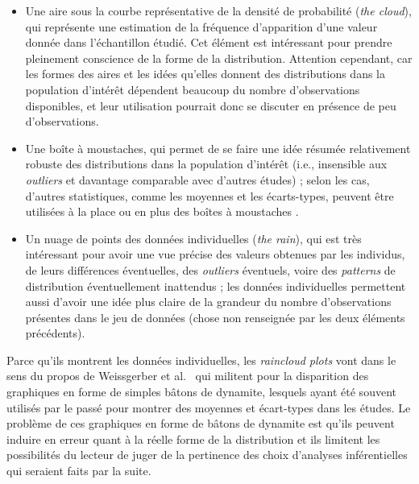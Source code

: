 \documentclass[
  french,
]{book}
\providecommand{\tightlist}{%
  \setlength{\itemsep}{0pt}\setlength{\parskip}{0pt}}
\begin{document}
\begin{itemize}
\tightlist
\item
  Une aire sous la courbe représentative de la densité de probabilité (\emph{the cloud}), qui représente une estimation de la fréquence d'apparition d'une valeur donnée dans l'échantillon étudié. Cet élément est intéressant pour prendre pleinement conscience de la forme de la distribution. Attention cependant, car les formes des aires et les idées qu'elles donnent des distributions dans la population d'intérêt dépendent beaucoup du nombre d'observations disponibles, et leur utilisation pourrait donc se discuter en présence de peu d'observations.
\item
  Une boîte à moustaches, qui permet de se faire une idée résumée relativement robuste des distributions dans la population d'intérêt (i.e., insensible aux \emph{outliers} et davantage comparable avec d'autres études) ; selon les cas, d'autres statistiques, comme les moyennes et les écarts-types, peuvent être utilisées à la place ou en plus des boîtes à moustaches \autocite{allenRaincloudPlotsMultiplatform2019}.
\item
  Un nuage de points des données individuelles (\emph{the rain}), qui est très intéressant pour avoir une vue précise des valeurs obtenues par les individus, de leurs différences éventuelles, des \emph{outliers} éventuels, voire des \emph{patterns} de distribution éventuellement inattendus ; les données individuelles permettent aussi d'avoir une idée plus claire de la grandeur du nombre d'observations présentes dans le jeu de données (chose non renseignée par les deux éléments précédents).
\end{itemize}

Parce qu'ils montrent les données individuelles, les \emph{raincloud plots} vont dans le sens du propos de Weissgerber et al.~\autocite*{weissgerberBarLineGraphs2015} qui militent pour la disparition des graphiques en forme de simples bâtons de dynamite, lesquels ayant été souvent utilisés par le passé pour montrer des moyennes et écart-types dans les études. Le problème de ces graphiques en forme de bâtons de dynamite est qu'ils peuvent induire en erreur quant à la réelle forme de la distribution et ils limitent les possibilités du lecteur de juger de la pertinence des choix d'analyses inférentielles qui seraient faits par la suite.
\end{document}
